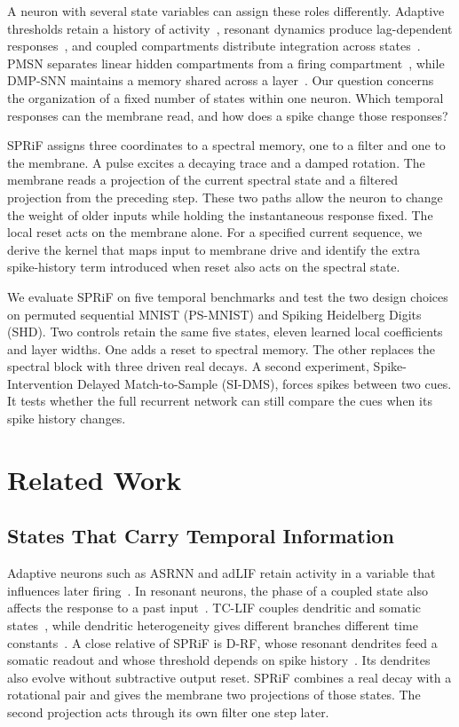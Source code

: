 \documentclass[letterpaper,journal]{IEEEtran}
\begin{document}
A neuron with several state variables can assign these roles differently. Adaptive thresholds retain a history of activity~\cite{asrnn,adlif}, resonant dynamics produce lag-dependent responses~\cite{izhikevich_rf,brf,drf}, and coupled compartments distribute integration across states~\cite{tclif,dhsnn}. PMSN separates linear hidden compartments from a firing compartment~\cite{pmsn2026}, while DMP-SNN maintains a memory shared across a layer~\cite{sun2026dmp}. Our question concerns the organization of a fixed number of states within one neuron. Which temporal responses can the membrane read, and how does a spike change those responses?

SPRiF assigns three coordinates to a spectral memory, one to a filter and one to the membrane. A pulse excites a decaying trace and a damped rotation. The membrane reads a projection of the current spectral state and a filtered projection from the preceding step. These two paths allow the neuron to change the weight of older inputs while holding the instantaneous response fixed. The local reset acts on the membrane alone. For a specified current sequence, we derive the kernel that maps input to membrane drive and identify the extra spike-history term introduced when reset also acts on the spectral state.

We evaluate SPRiF on five temporal benchmarks and test the two design choices on permuted sequential MNIST (PS-MNIST) and Spiking Heidelberg Digits (SHD). Two controls retain the same five states, eleven learned local coefficients and layer widths. One adds a reset to spectral memory. The other replaces the spectral block with three driven real decays. A second experiment, Spike-Intervention Delayed Match-to-Sample (SI-DMS), forces spikes between two cues. It tests whether the full recurrent network can still compare the cues when its spike history changes.

\section{Related Work}
\label{sec:related}

\subsection{States That Carry Temporal Information}

Adaptive neurons such as ASRNN and adLIF retain activity in a variable that influences later firing~\cite{asrnn,adlif}. In resonant neurons, the phase of a coupled state also affects the response to a past input~\cite{izhikevich_rf,brf}. TC-LIF couples dendritic and somatic states~\cite{tclif}, while dendritic heterogeneity gives different branches different time constants~\cite{dhsnn}. A close relative of SPRiF is D-RF, whose resonant dendrites feed a somatic readout and whose threshold depends on spike history~\cite{drf}. Its dendrites also evolve without subtractive output reset. SPRiF combines a real decay with a rotational pair and gives the membrane two projections of those states. The second projection acts through its own filter one step later.
\end{document}
